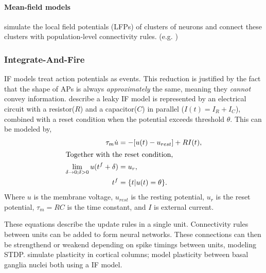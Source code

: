 \paragraph{Mean-field models} simulate the local field potentials (LFPs) of clusters of neurons
and connect these clusters with population-level connectivity rules. (e.g.
\cite{jansen1995electroencephalogram})

\subsubsection{Integrate-And-Fire}
IF models treat action potentials as events.
This reduction is justified by the fact that the shape of APs is always \textit{approximately}
the same, meaning they \textit{cannot} convey information. \cite{gerstner2014if} describe a leaky IF model
is represented by an electrical circuit with a resistor($R$) and a capacitor($C$) in parallel
($I(t) = I_R + I_C$), combined with a reset condition when the potential exceeds threshold
$\theta$.
This can be modeled by,
\begin{align}
	\tau_m \dot u                                           & = -[u(t) - u_{rest}] + RI(t),                                    \\
	\intertext{Together with the reset condition,}
	\lim_{\delta \rightarrow 0; \delta > 0} u(t^f + \delta) & = u_r,                                                           \\
	t^f                                                     & = \{t | u(t)                                        = \theta \}.
\end{align}
Where $u$ is the membrane voltage, $u_{rest}$ is the resting potential, $u_r$ is the reset
potential, $\tau_m = RC$ is the time constant, and $I$ is external current.

These equations describe the update rules in a single unit. Connectivity rules between units
can be added to form neural networks. These connections can then be strengthend or weakend
depending on spike timings between units, modeling STDP. \cite{shupe2021integrate} simulate
plasticity in cortical columns; \cite{kromer2023synaptic} model plasticity between basal ganglia
nuclei both using a IF model.

